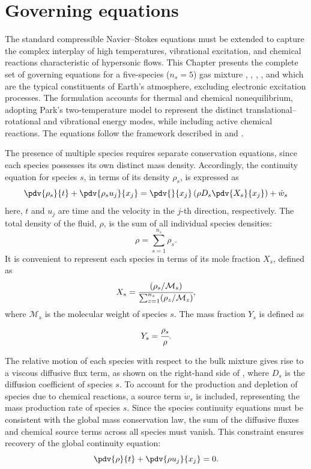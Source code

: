 \chapter{Governing equations}\label{chapter:governing_equations}
The standard compressible Navier--Stokes equations must be extended to capture the complex interplay of high temperatures, vibrational excitation, and chemical reactions characteristic of hypersonic flows. This Chapter presents the complete set of governing equations for a five-species  ($n_s = 5$) gas mixture , , , , and  which are the typical constituents of Earth's atmosphere, excluding electronic excitation processes. The formulation accounts for thermal and chemical nonequilibrium, adopting Park's two-temperature model to represent the distinct translational--rotational and vibrational energy modes, while including active chemical reactions. The equations follow the framework described in \citet{Gnoffo1989} and \cite{Park1990}.

The presence of multiple species requires separate conservation equations, since each species possesses its own distinct mass density. Accordingly, the continuity equation for species $s$, in terms of its density $\rho_s$, is expressed as
\begin{equation}\label{equation:global_species_continuity}
    \pdv{\rho_s}{t} + \pdv{\rho_s u_{j}}{x_{j}} = \pdv{}{x_{j}} \left( \rho D_s \pdv{X_s}{x_{j}} \right) + \dot{w}_s  
\end{equation} here, $t$ and $u_j$ are time and the velocity in the $j$-th direction, respectively. The total density of the fluid, $\rho$, is the sum of all individual species densities:
\begin{equation}
    \rho = \sum^{n_s}_{s=1} \rho_s.
\end{equation}
It is convenient to represent each species in terms of its mole fraction $X_s$, defined as
\begin{equation}
    X_s = \cfrac{(\rho_s/\mathcal{M}_s)}{\sum_{z=1}^{n_s} (\rho_z/\mathcal{M}_z)},
\end{equation}
where $\mathcal{M}_s$ is the molecular weight of species $s$. The mass fraction $Y_s$ is defined as
\begin{equation}
    Y_s = \cfrac{\rho_s}{\rho}.
\end{equation}

The relative motion of each species with respect to the bulk mixture gives rise to a viscous diffusive flux term, as shown on the right-hand side of , where $D_s$ is the diffusion coefficient of species $s$. To account for the production and depletion of species due to chemical reactions, a source term $\dot{w}_s$ is included, representing the mass production rate of species $s$. Since the species continuity equations must be consistent with the global mass conservation law, the sum of the diffusive fluxes and chemical source terms across all species must vanish. This constraint ensures recovery of the global continuity equation:
\begin{equation}\label{equation:global_continuity}
    \pdv{\rho}{t} + \pdv{\rho u_j}{x_j} = 0.
\end{equation}

